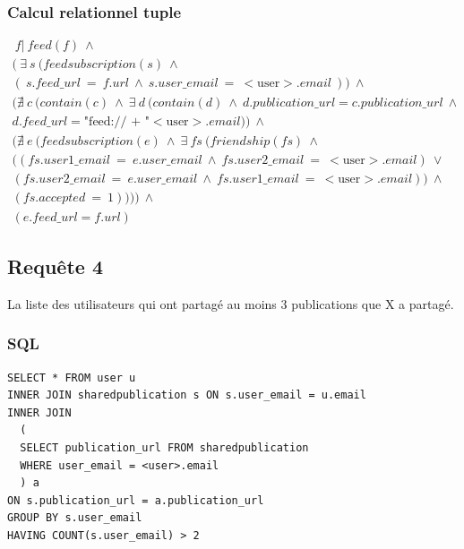 \documentclass[a4paper,10pt]{article}
\begin{document}
\subsubsection{Calcul relationnel tuple}

\begin{equation*}
 \begin{split}
  \ f |\ feed(f)\ \wedge\\
  (\ \exists\ s\ (feedsubscription(s)\ \wedge\\
  (\ s.feed\_url\ =\ f.url\ \wedge\ s.user\_email\ =\ <\text{user}>.email\ ))\   \wedge\\
  (\nexists\ c\ (contain(c)\ \wedge\ \exists\ d\ (contain(d)\ \wedge\ d.publication\_url = c.publication\_url\ \wedge\\
  d.feed\_url = \text{"feed:// + "}<\text{user}>.email) )\ \wedge\\
  (\nexists\ e\ (feedsubscription(e)\ \wedge\ \exists\ fs\ (friendship(fs)\ \wedge\\
  ((fs.user1\_email\ =\ e.user\_email\ \wedge\ fs.user2\_email\ =\ <\text{user}>.email)\ \vee\\
  (fs.user2\_email\ =\ e.user\_email\ \wedge\ fs.user1\_email\ =\ <\text{user}>.email))\ \wedge\\
  (fs.accepted\ =\ 1))))\ \wedge\\
  (e.feed\_url = f.url)
  \end{split}
\end{equation*}
\clearpage
\subsection{Requête 4}
La liste des utilisateurs qui ont partagé au moins 3 publications que X a partagé.
\subsubsection{SQL}
\begin{lstlisting}
SELECT * FROM user u
INNER JOIN sharedpublication s ON s.user_email = u.email
INNER JOIN 
  (
  SELECT publication_url FROM sharedpublication 
  WHERE user_email = <user>.email
  ) a
ON s.publication_url = a.publication_url
GROUP BY s.user_email
HAVING COUNT(s.user_email) > 2
\end{lstlisting}
\end{document}
